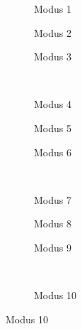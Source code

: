 \documentclass[]{report}
\newlength\figureheight
\newlength\figurewidth
\begin{document}
\begin{enumerate}
\begin{enumerate}
			\setlength\figureheight{4cm}
			\setlength{}
			\begin{figure}[tbp!]
				\begin{subfigure}{0.3\textwidth}
					\centering
					
					\caption{Modus 1}
					\label{fig:mode1}
				\end{subfigure}
				\quad
				\begin{subfigure}{0.3\textwidth}
					\centering
					
					\caption{Modus 2}
					\label{fig:mode2}
				\end{subfigure}	
				\quad
				\begin{subfigure}{0.3\textwidth}
					\centering
					
					\caption{Modus 3}
					\label{fig:mode3}
				\end{subfigure}	
				\\
				\begin{subfigure}{0.3\textwidth}
					\centering
					
					\caption{Modus 4}
					\label{fig:mode4}
				\end{subfigure}
				\quad
				\begin{subfigure}{0.3\textwidth}
					\centering
					
					\caption{Modus 5}
					\label{fig:mode5}
				\end{subfigure}	
				\quad
				\begin{subfigure}{0.3\textwidth}
					\centering
					
					\caption{Modus 6}
					\label{fig:mode6}
				\end{subfigure}	
				\\
				\begin{subfigure}{0.3\textwidth}
					\centering
					
					\caption{Modus 7}
					\label{fig:mode7}
				\end{subfigure}
				\quad
				\begin{subfigure}{0.3\textwidth}
					\centering
					
					\caption{Modus 8}
					\label{fig:mode8}
				\end{subfigure}	
				\quad
				\begin{subfigure}{0.3\textwidth}
					\centering
					
					\caption{Modus 9}
					\label{fig:mode9}
				\end{subfigure}	
				\\
				\begin{subfigure}{0.3\textwidth}
					\centering
					
					\caption{Modus 10}
					\label{fig:mode10}
				\end{subfigure}

\end{figure}
\end{enumerate}
\end{enumerate}
\end{document}
